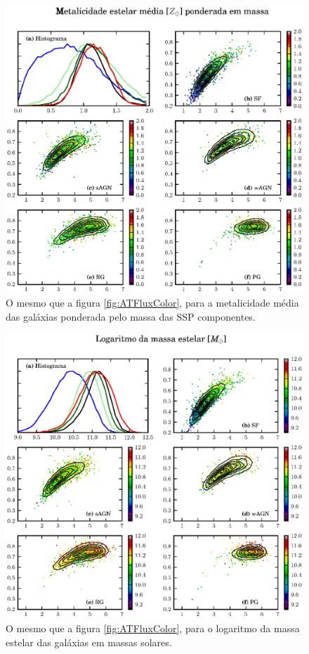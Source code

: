 \begin{figure}
	\includegraphics{figuras/uvcolor-color-am_mass-byclass.eps}
	\caption[Metalicidade das galáxias ponderada em massa no diagrama cor--cor UV.]
	{O mesmo que a figura \ref{fig:ATFluxColor}, para a metalicidade média das
	galáxias ponderada pelo massa das SSP componentes.}
	\label{fig:AMMassColor}
\end{figure}

\begin{figure}
	\includegraphics{figuras/uvcolor-color-mcor_gal-byclass.eps}
	\caption[Massa estelar das galáxias no diagrama cor--cor UV.]
	{O mesmo que a figura \ref{fig:ATFluxColor}, para o logaritmo da massa estelar
	das galáxias em massas solares.}
	\label{fig:MCorGalColor}
\end{figure}

